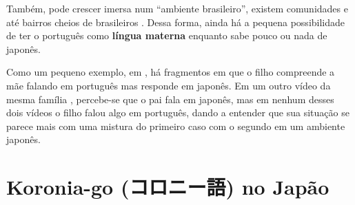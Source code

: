 \documentclass{article}
\newcommand{\jap}[1]{#1}
\newcommand{\keyword}[1]{\textbf{#1}}
\newcommand{\koroniago}{\jap{コロニー語}}
\begin{document}
Também, pode crescer imersa num ``ambiente brasileiro'',
existem comunidades e até bairros cheios de brasileiros
\cite{japaoimigrantesbrasileiros} \cite{escolasbrjp}
\cite{regioesmaisbrjp}
\cite{videobairrojpcarla} \cite{videobairrojpfernando}
\cite{videocidadebr}.
Dessa forma, ainda há a pequena possibilidade de
ter o português como \keyword{língua materna}
enquanto sabe pouco ou nada de japonês.

Como um pequeno exemplo,
em \cite{videobairrojpcarla},
há fragmentos em que o filho compreende a mãe falando
em português mas responde em japonês.
Em um outro vídeo da mesma família \cite{videoramencarla},
percebe-se que o pai fala em japonês,
mas em nenhum desses dois vídeos
o filho falou algo em português,
dando a entender que sua situação
se parece mais com uma mistura do primeiro caso
com o segundo em um ambiente japonês.

\section{Koronia-go (\koroniago{}) no Japão}

\newpage

\nocite{*}


\end{document}
